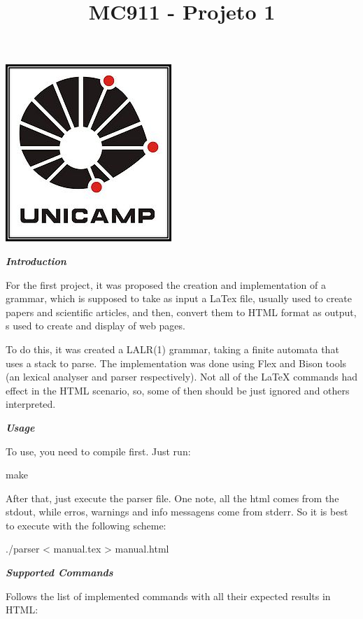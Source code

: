 \documentclass{article}
\title{MC911 - Projeto 1}
\begin{document}
\includegraphics{unicamp}

\maketitle

\textbf{\textit{Introduction}}

For the first project, it was proposed the creation and implementation of a grammar, which is supposed to take as input a LaTex file, usually used to create papers and scientific articles, and then, convert them to HTML format as output, s used to create and display of web pages.

To do this, it was created a LALR(1) grammar, taking a finite automata that uses a stack to parse. The implementation was done using Flex and Bison tools (an lexical analyser and parser respectively). Not all of the LaTeX commands had effect in the HTML scenario, so, some of then should be just ignored and others interpreted.

\textbf{\textit{Usage}}

To use, you need to compile first. Just run:

	make

After that, just execute the parser file. One note, all the html comes from the stdout, while erros, warnings and info messagens come from stderr. So it is best to execute with the following scheme:

	./parser < manual.tex > manual.html 

\textit{\textbf{Supported Commands}}

Follows the list of implemented commands with all their expected results in HTML:
\end{document}

